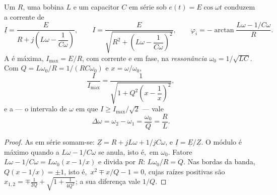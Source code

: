 \begin{theorem}\label{thm:b1:sinusoidal-impedance:resonance}
Um  $R$, uma bobina $L$ e um capacitor $C$ em série sob
$e(t) = E\cos\omega t$ conduzem a corrente de 
\[
\underline I = \frac{E}{R + j\left(L\omega - \dfrac{1}{C\omega}\right)},
\qquad
I = \frac{E}{\sqrt{R^2 + \left(L\omega - \dfrac{1}{C\omega}\right)^2}},
\qquad
\varphi_i = -\arctan\frac{L\omega - 1/C\omega}{R} .
\]
A  é máxima, $I_{\max} = E/R$, com corrente e  em
fase, na \emph{ressonância} $\omega_0 = 1/\sqrt{LC}$. Com
$Q = L\omega_0/R = 1/(RC\omega_0)$ e $x = \omega/\omega_0$,
\[
\frac{I}{I_{\max}} = \frac{1}{\sqrt{1 + Q^2\left(x - \dfrac1x\right)^2}} ,
\]
e a \emph{} --- o intervalo de $\omega$ em que
$I \geq I_{\max}/\sqrt2$ --- vale
\[
\Delta\omega = \omega_2 - \omega_1 = \frac{\omega_0}{Q} = \frac{R}{L} .
\]
\end{theorem}

\begin{proof}
As  em série somam-se: $\underline Z = R + jL\omega + 1/jC\omega$, e
$\underline I = \underline E/\underline Z$. O módulo é máximo quando
a  $L\omega - 1/C\omega$ se anula, isto é,\ em $\omega_0$.
Fatore $L\omega - 1/C\omega = L\omega_0(x - 1/x)$ e divida por $R$:
$L\omega_0/R = Q$. Nas bordas da banda, $Q(x - 1/x) = \pm 1$, isto é,\
$x^2 \mp x/Q - 1 = 0$, cujas raízes positivas são $x_{1,2} = \mp\frac{1}{2Q}
+ \sqrt{1 + \frac{1}{4Q^2}}$; a sua diferença vale $1/Q$.
\end{proof}

